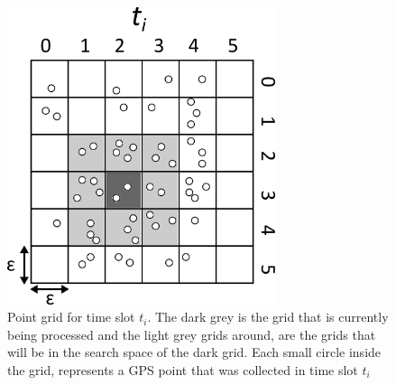\begin{figure}[h!]
    \centering
    \includegraphics[width=0.7\textwidth]{images/grid.png}
    \caption{Point grid for time slot $t_i$. The dark grey is the grid that is currently being processed and the light
        grey grids around, are the grids that will be in the search space of the dark grid. Each small circle inside the
        grid, represents a GPS point that was collected in time slot $t_i$}
    \label{fig:grid}
\end{figure}
